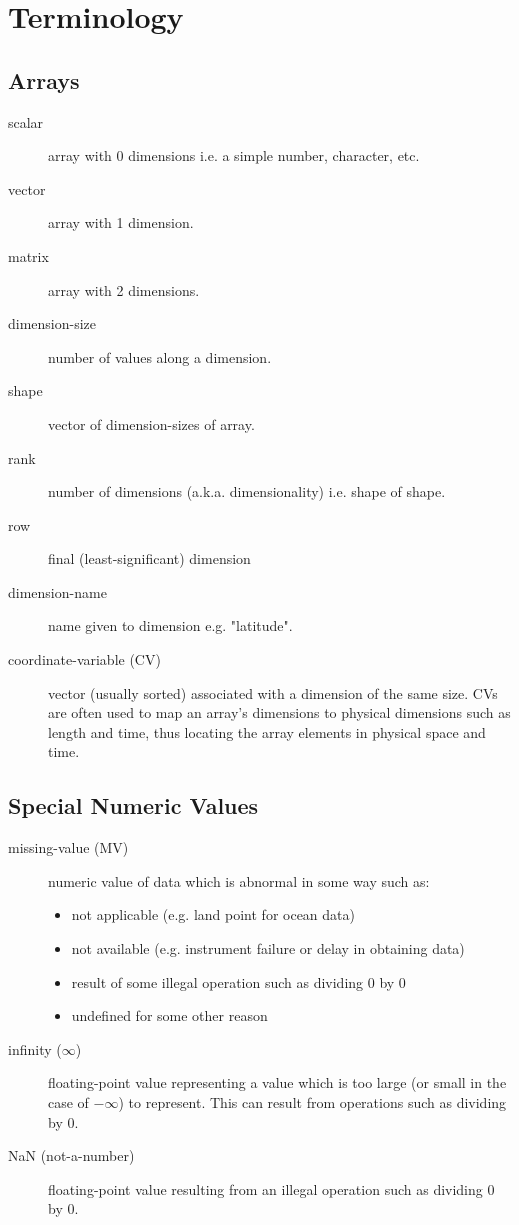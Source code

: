       \section{Terminology}

    \subsection{Arrays}

    \begin{description}
      \item[scalar]
      array with 0 dimensions i.e. a simple number, character,
      etc.
      \item[vector]
      array with 1 dimension.
      \item[matrix]
      array with 2 dimensions.
      \item[dimension-size]
      number of values along a dimension.
      \item[shape]
      vector of dimension-sizes of array.
      \item[rank]
      number of dimensions (a.k.a. dimensionality) i.e. shape of
      shape.
      \item[row]
      final (least-significant) dimension
      \item[dimension-name]
      name given to dimension e.g. "latitude".
      \item[coordinate-variable (CV)]
      vector (usually sorted) associated with a dimension of the
      same size. CVs are often used to map an array's dimensions to
      physical dimensions such as length and time, thus locating the
      array elements in physical space and time.
    \end{description}
    \subsection{Special Numeric Values}

    \begin{description}
      \item[missing-value (MV)]
      numeric value of data which is abnormal in some way such as:
	  \begin{itemize}
	    \item not applicable (e.g. land point for ocean data)
	    \item not available (e.g. instrument failure or delay in
	    obtaining data)
	    \item result of some illegal operation such as dividing 0 by 0
	    \item undefined for some other reason 
	  \end{itemize}
      \item[infinity ($\infty$)]
      floating-point value representing a value which is too
          large (or small in the case of $-\infty$) to
          represent. This can result from operations such as dividing
          by 0.
      \item[NaN (not-a-number)]
      floating-point value resulting from an illegal operation
          such as dividing 0 by 0.
    \end{description}
